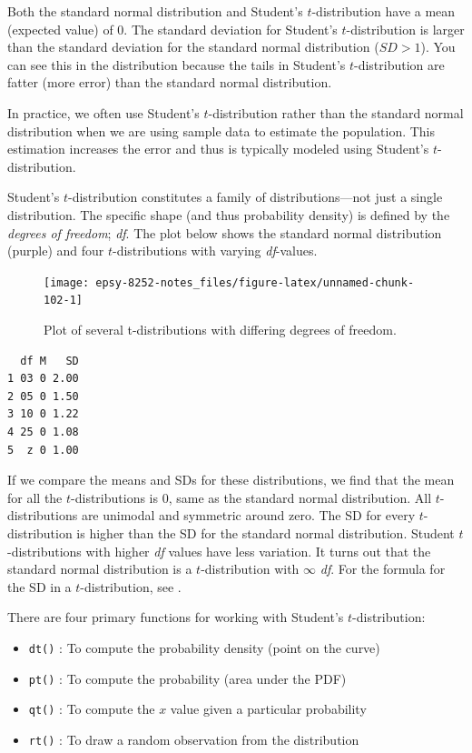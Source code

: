 \documentclass[]{book}
\providecommand{\tightlist}{%
  \setlength{\itemsep}{0pt}\setlength{\parskip}{0pt}}
\begin{document}
Both the standard normal distribution and Student's \(t\)-distribution have a mean (expected value) of 0. The standard deviation for Student's \(t\)-distribution is larger than the standard deviation for the standard normal distribution (\(SD>1\)). You can see this in the distribution because the tails in Student's \(t\)-distribution are fatter (more error) than the standard normal distribution.

In practice, we often use Student's \(t\)-distribution rather than the standard normal distribution when we are using sample data to estimate the population. This estimation increases the error and thus is typically modeled using Student's \(t\)-distribution.

Student's \(t\)-distribution constitutes a family of distributions---not just a single distribution. The specific shape (and thus probability density) is defined by the \emph{degrees of freedom}; \emph{df}. The plot below shows the standard normal distribution (purple) and four \(t\)-distributions with varying \emph{df}-values.

\begin{figure}

{\centering \texttt{[image: epsy-8252-notes\_files/figure-latex/unnamed-chunk-102-1]} 

}

\caption{Plot of several t-distributions with differing degrees of freedom.}\label{fig:unnamed-chunk-102}
\end{figure}

\begin{verbatim}
  df M   SD
1 03 0 2.00
2 05 0 1.50
3 10 0 1.22
4 25 0 1.08
5  z 0 1.00
\end{verbatim}

If we compare the means and SDs for these distributions, we find that the mean for all the \(t\)-distributions is 0, same as the standard normal distribution. All \(t\)-distributions are unimodal and symmetric around zero. The SD for every \(t\)-distribution is higher than the SD for the standard normal distribution. Student \(t\)-distributions with higher \emph{df} values have less variation. It turns out that the standard normal distribution is a \(t\)-distribution with \(\infty\) \emph{df}. For the formula for the SD in a \(t\)-distribution, see \citet{Fox:2009}.

There are four primary functions for working with Student's \(t\)-distribution:

\begin{itemize}
\tightlist
\item
  \texttt{dt()} : To compute the probability density (point on the curve)
\item
  \texttt{pt()} : To compute the probability (area under the PDF)
\item
  \texttt{qt()} : To compute the \(x\) value given a particular probability
\item
  \texttt{rt()} : To draw a random observation from the distribution
\end{itemize}
\end{document}
